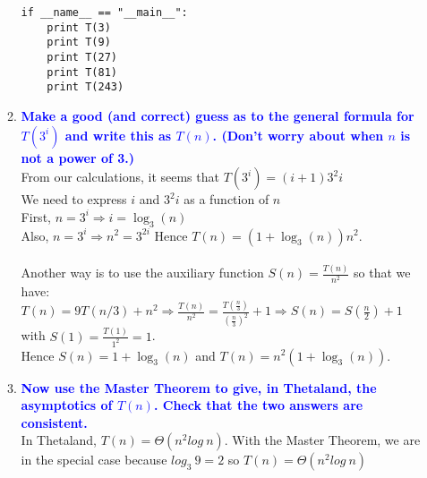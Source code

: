 \documentclass[11pt]{article}
\begin{document}
\begin{enumerate}
\begin{enumerate}
\begin{verbatim}
if __name__ == "__main__":
    print T(3)
    print T(9)
    print T(27)
    print T(81)
    print T(243)
        \end{verbatim}
    \item \textbf{\textcolor{blue}{Make a good (and correct) guess as to the general formula for $T(3^i)$ and write this as $T(n)$. (Don't worry about when $n$ is not a power of 3.)}}
        \\ From our calculations, it seems that $T(3^i) = (i + 1)3^2i$
        \\ We need to express $i$ and $3^2i$ as a function of $n$
        \\ First, $n = 3^i \Rightarrow i = \log_3(n)$
        \\ Also, $n = 3^i \Rightarrow n^2 = 3^{2i}$
        Hence $T(n) = (1 + \log_3(n))n^2$.
        \\\\ Another way is to use the auxiliary function $S(n) = \frac{T(n)}{n^2}$ so that we have:
        \\ $T(n)=9T(n/3) + n^2 \Rightarrow \frac{T(n)}{n^2} = \frac{T(\frac{n}{3})}{(\frac{n}{3})^2} + 1 \Rightarrow 
        S(n) = S(\frac{n}{2}) + 1$ with $S(1)=\frac{T(1)}{1^2}=1$.
        \\ Hence $S(n)=1+\log_3(n)$ and $T(n)=n^2(1+\log_3(n))$.
    \item \textbf{\textcolor{blue}{Now use the Master Theorem to give, in Thetaland, the asymptotics of $T(n)$. Check that the two answers are consistent.}}
        \\ In Thetaland, $T(n) = \Theta(n^2 log\ n)$. With the Master Theorem, we are in the special case because $log_3\ 9 = 2$ so $T(n) = \Theta(n^2 log\ n)$
    \end{enumerate}


\end{enumerate}
\end{document}
